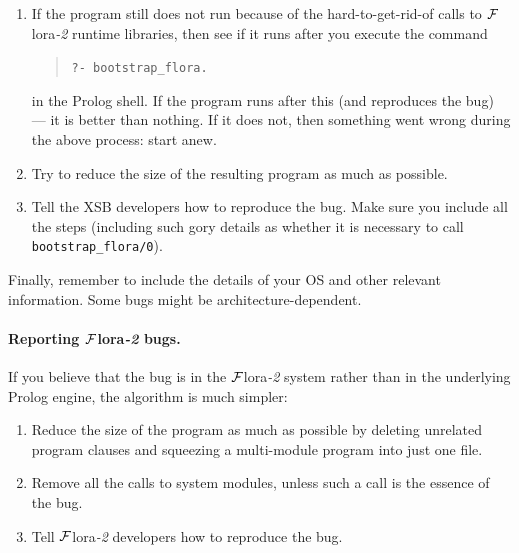 \documentclass[11pt]{article}
\newcommand{\FLSYSTEM}{{\mbox{\sc ${\cal F}${lora}\rm\emph{-2}}}\xspace}
\newcommand{\FLBOOTSTRAP}{bootstrap\_flora}
\begin{document}
\begin{enumerate}
    Other calls that are often no longer needed in the dumped code are
    those that load \FLSYSTEM runtime libraries (which we are trying to
    eliminate!). These calls have the form
    \begin{verbatim}
   ?- flora_load_library(...).      
    \end{verbatim}
    If there are other calls to \FLSYSTEM runtime libraries, try to delete
    them, but make sure that the bug is still reproducible.
  \item If the program still does not run because of the hard-to-get-rid-of
    calls to \FLSYSTEM runtime libraries, then see if it runs after you
    execute the command
    \begin{quote}
       {\tt ?- \FLBOOTSTRAP.}      
    \end{quote}
    in the Prolog shell. If the program runs after this (and reproduces the
    bug) --- it is better than nothing. If it does not, then something went
    wrong during the above process: start anew.
  \item Try to reduce the size of the resulting program as much as possible.
  \item Tell the XSB developers how to reproduce the bug. Make sure you
    include all the steps (including such gory details as whether it is
    necessary to call {\tt \FLBOOTSTRAP/0}).
\end{enumerate}
Finally, remember to include the details of your OS and other relevant
information. Some bugs might be architecture-dependent.

\paragraph{Reporting \FLSYSTEM bugs.}
If you believe that the bug is in the \FLSYSTEM system rather than in the
underlying Prolog engine, the algorithm is much simpler: 
\begin{enumerate}
  \item Reduce the size of the program as much as possible by deleting 
    unrelated program clauses and squeezing a multi-module program into
    just one file.
  \item Remove all the calls to system modules, unless such a call is
    the essence of the bug.
  \item Tell \FLSYSTEM developers how to reproduce the bug.
\end{enumerate}
\end{document}

